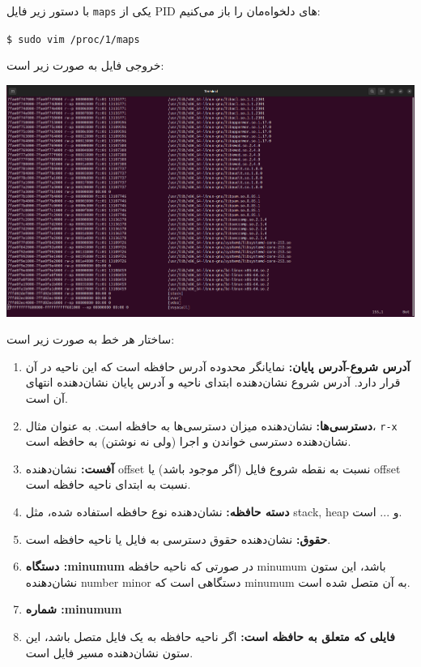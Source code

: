\begin{qsolve}
با دستور زیر فایل \texttt{maps} یکی از PID های دلخواه‌مان را باز می‌کنیم:

\begin{latin}
	\texttt{\$ sudo vim /proc/1/maps} 
\end{latin}

خروجی فایل به صورت زیر است:
\begin{center}
	\includegraphics[width=\textwidth]{pics/img1.png}
\end{center}

ساختار هر خط به صورت زیر است:

\begin{enumerate}
	\item \textbf{آدرس شروع-آدرس پایان:}
	نمایانگر محدوده آدرس حافظه است که این ناحیه در آن قرار دارد. آدرس شروع نشان‌دهنده ابتدای ناحیه و آدرس پایان نشان‌دهنده انتهای آن است.
	\item \textbf{دسترسی‌ها:}
	نشان‌دهنده میزان دسترسی‌ها به حافظه است. به عنوان مثال، \texttt{r-x} نشان‌دهنده دسترسی خواندن و اجرا (ولی نه نوشتن) به حافظه است.
	
	\item \textbf{آفست:}
	نشان‌دهنده offset نسبت به نقطه شروع فایل (اگر موجود باشد) یا offset نسبت به ابتدای ناحیه حافظه است.
	
	\item \textbf{دسته حافظه:}
	نشان‌دهنده نوع حافظه استفاده شده، مثل stack, heap و ... است.
	
	\item \textbf{حقوق:}
	نشان‌دهنده حقوق دسترسی به فایل یا ناحیه حافظه است.
	
	\item \textbf{دستگاه :minumum}
	در صورتی که ناحیه حافظه minumum باشد، این ستون نشان‌دهنده number minor دستگاهی است که minumum به آن متصل شده است.
	
	\item \textbf{شماره :minumum}
	
	
	\item \textbf{فایلی که متعلق به حافظه است:}
	اگر ناحیه حافظه به یک فایل متصل باشد، این ستون نشان‌دهنده مسیر فایل است. 
\end{enumerate}

\end{qsolve}